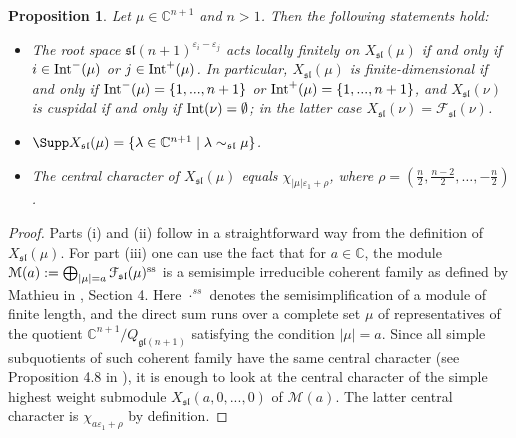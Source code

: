 \documentclass[12pt]{amsart}
\newcommand{\C}{{\mathbb C}}
\def\gg{\mathfrak{g}}
\def\gl{\mathfrak{l}}
\newtheorem{prop}[thm]{Proposition}
\begin{document}
\begin{prop} \label{prop-x-sl}  Let $\mu \in \C^{n+1}$ and $n>1$. Then the following statements hold: 

\begin{itemize}
\item[(i)] The root space $\mathfrak{sl}(n+1)^{\varepsilon_i-\varepsilon_j}$ acts locally finitely on $X_{\mathfrak{sl}}(\mu)$ if and only if $i \in {\rm Int}^- (\mu)$ or $j \in {\rm Int}^+ (\mu)$.  In particular, $X_{\mathfrak{sl}}(\mu)$ is  finite-dimensional if and only if ${\rm Int}^- (\mu) = \{1,...,n+1 \}$ or ${\rm Int}^+ (\mu) = \{1,...,n+1 \}$, and  $X_{\mathfrak{sl}}(\nu)$ is cuspidal if and only if $ {\rm Int} (\nu) = \emptyset$; in the latter case  $X_{\mathfrak{sl}}(\nu) = {\mathcal F}_{\mathfrak{sl}} (\nu)$.
\item[(ii)] $\Supp X_{\mathfrak{sl}}(\mu) = \{\lambda \in \C^{n+1} \; | \; \lambda \sim_{\mathfrak{sl}} \mu\}$.
\item[(iii)] The central character of $X_{\mathfrak{sl}}(\mu)$ equals $\chi_{|\mu|\varepsilon_1+\rho}$, where $\rho=(\frac{n}{2},\frac{n-2}{2},\dots, -\frac{n}{2})$. 
\end{itemize}
\end{prop}
\begin{proof}Parts (i) and  (ii) follow in a straightforward way from the definition of $X_{\mathfrak{sl}}(\mu)$. For part (iii) one can use the fact that for $a \in \C$, the module ${\mathcal M} (a) := \bigoplus_{|\mu| = a}{\mathcal F}_{\mathfrak{sl}} (\mu)^{\rm ss}$ is a semisimple irreducible coherent family as defined by Mathieu in \cite{M}, Section 4. Here $\cdot^{ss}$ denotes the semisimplification of a module of finite length, and the direct sum runs over a complete set $\mu$ of  representatives of the quotient $\C^{n+1}/Q_{\gg \gl (n+1)}$ satisfying the condition $|\mu|=a$. Since all simple subquotients of such coherent family have the same central character (see Proposition 4.8 in \cite{M}), it is enough to look at the central character of  the simple highest weight submodule $X_{\mathfrak{sl}}(a, 0,...,0)$ of ${\mathcal M} (a) $. The latter central character is  $\chi_{a\varepsilon_1+\rho}$ by definition. \end{proof}
\end{document}
